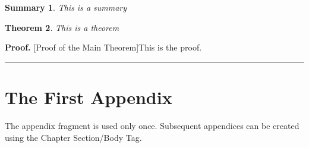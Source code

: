 \documentclass[11pt,spanish]{report}
\newtheorem{theorem}{Theorem}
\newtheorem{summary}[theorem]{Summary}
\newenvironment{proof}[1][Proof]{\textbf{#1.} }{\ \rule{0.5em}{0.5em}}
\begin{document}
\begin{summary}
This is a summary
\end{summary}

\begin{theorem}
This is a theorem
\end{theorem}

\begin{proof}
[Proof of the Main Theorem]This is the proof.
\end{proof}

\appendix 

\chapter{The First Appendix}

The appendix fragment is used only once. Subsequent appendices can be created
using the Chapter Section/Body Tag.



\end{document}

